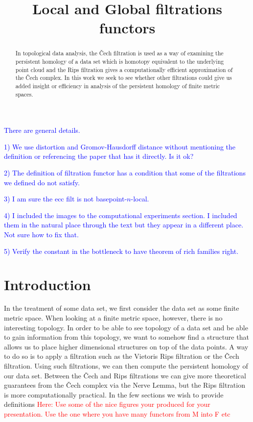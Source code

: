 \documentclass[a4paper,12pt,reqno, english]{amsart}
\title{Local and Global filtrations functors}
\theoremstyle{plain}
\theoremstyle{definition}
\newcommand{\facundo}[1]{\textcolor{red}{#1}}
\newcommand{\jose}[1]{\textcolor{blue}{#1} }
\begin{document}


\begin{abstract}


In topological data analysis, the \v{C}ech filtration is used as a way of examining the persistent homology of a data set which is homotopy equivalent to the underlying point cloud and the Rips filtration gives a computationally efficient approximation of the \v{C}ech complex. In this work we seek to see whether other filtrations could give us added insight or efficiency in analysis of the persistent homology of finite metric spaces.

\end{abstract}

\maketitle

\jose{There are general details.} 

\jose{1) We use distortion and Gromov-Hausdorff distance without mentioning the definition or referencing the paper that has it directly. Is it ok?}

\jose{2) The definition of filtration functor has a condition that some of the filtrations we defined do not satisfy.}

\jose{3) I am sure the ecc filt is not basepoint-$n$-local.}

\jose{4) I included the images to the computational experiments section. I included them in the natural place through the text but they appear in a different place. Not sure how to fix that.}

\jose{5) Verify the constant in the bottleneck to have theorem of rich families right.}

\tableofcontents

\section*{Introduction}
In the treatment of some data set, we first consider the data set as some finite metric space. When looking at a finite metric space, however, there is no interesting topology. In order to be able to see topology of a data set and be able to gain information from this topology, we want to somehow find a structure that allows us to place higher dimensional structures on top of the data points. A way to do so is to apply a filtration such as the Vietoris Rips filtration or the \v{C}ech filtration. Using such filtrations, we can then compute the persistent homology of our data set. Between the \v{C}ech and Rips filtrations we can give more theoretical guarantees from the \v{C}ech complex via the Nerve Lemma, but the Rips filtration is more computationally practical. In the few sections we wish to provide definitions
\facundo{Here: Use some of the nice figures your produced for your presentation. Use the one where you have many functors from M into F etc}
\end{document}
